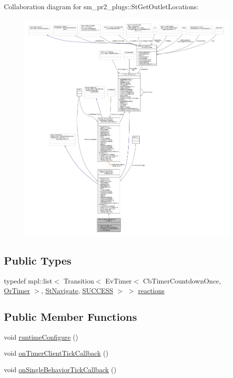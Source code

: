 Collaboration diagram for sm\+\_\+pr2\+\_\+plugs\+:\+:St\+Get\+Outlet\+Locations\+:
\nopagebreak
\begin{figure}[H]
\begin{center}
\leavevmode
\includegraphics[width=350pt]{structsm__pr2__plugs_1_1StGetOutletLocations__coll__graph}
\end{center}
\end{figure}
\subsection*{Public Types}
\begin{DoxyCompactItemize}
\item 
typedef mpl\+::list$<$ Transition$<$ Ev\+Timer$<$ Cb\+Timer\+Countdown\+Once, \hyperlink{classsm__pr2__plugs_1_1OrTimer}{Or\+Timer} $>$, \hyperlink{structsm__pr2__plugs_1_1StNavigate}{St\+Navigate}, \hyperlink{classSUCCESS}{S\+U\+C\+C\+E\+SS} $>$ $>$ \hyperlink{structsm__pr2__plugs_1_1StGetOutletLocations_ac47595196c2aa76d0c1515c7bdd55542}{reactions}
\end{DoxyCompactItemize}
\subsection*{Public Member Functions}
\begin{DoxyCompactItemize}
\item 
void \hyperlink{structsm__pr2__plugs_1_1StGetOutletLocations_ad5b299ff3f4253429690b22f3a81d9cf}{runtime\+Configure} ()
\item 
void \hyperlink{structsm__pr2__plugs_1_1StGetOutletLocations_a46a5f83dd8f5465356ab0652f34c9c52}{on\+Timer\+Client\+Tick\+Callback} ()
\item 
void \hyperlink{structsm__pr2__plugs_1_1StGetOutletLocations_acdde8773e35f30d4c5084903e2fe0259}{on\+Single\+Behavior\+Tick\+Callback} ()
\end{DoxyCompactItemize}
